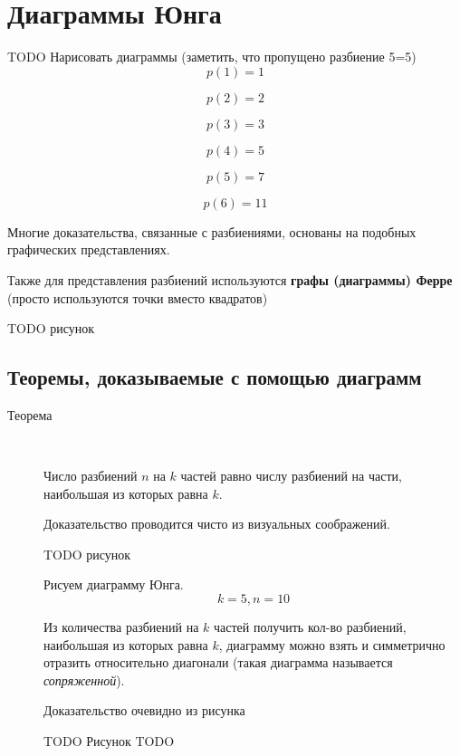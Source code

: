 \section{Диаграммы Юнга}

TODO Нарисовать диаграммы (заметить, что пропущено разбиение 5=5) \\

$$
p(1) = 1
$$

$$
p(2) = 2
$$

$$
p(3) = 3
$$

$$
p(4) = 5
$$

$$
p(5) = 7
$$

$$
p(6) = 11
$$

Многие доказательства, связанные с разбиениями, основаны на подобных графических представлениях.

Также для представления разбиений используются \textbf{графы (диаграммы) Ферре} (просто используются точки вместо квадратов)

TODO рисунок

\subsection{Теоремы, доказываемые с помощью диаграмм}

\begin{description}
\item[Теорема]~	

Число разбиений $ n $ на $ k $ частей равно числу разбиений на части, наибольшая из которых равна $ k $.

Доказательство проводится чисто из визуальных соображений.

TODO рисунок

Рисуем диаграмму Юнга.
$$
k = 5, n = 10
$$

Из количества разбиений на $ k $ частей получить кол-во разбиений, наибольшая из которых равна $ k $, диаграмму можно взять и симметрично отразить относительно диагонали (такая диаграмма называется \textit{сопряженной}).

Доказательство очевидно из рисунка

TODO Рисунок
TODO

\end{description}


